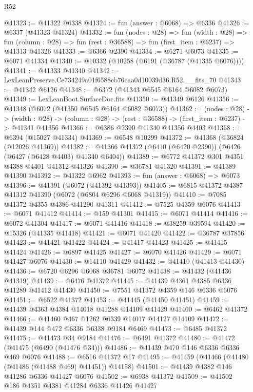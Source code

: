 \begin{lexlean}{R52}
\begin{coremodule}
@41323 := @41322 @6338
@41324 := fun (answer : @6068) => @6336
@41326 := @6337 (@41323 @41324)
@41332 := fun (nodes : @28) =>
  fun (width : @28) =>
  fun (column : @28) => fun (rest : @36588) => fun (first_item : @6237) => @41313 @41326
@41333 := @6366 @2390
@41334 := @6271 @6073
@41335 := @6071 @41334
@41340 := @10332 (@10258 (@6191 (@36787 (@41335 @6076))))
@41341 := @41333 @41340
@41342 := LexLeanPreserve.Ce734249a01f6588cb76caa0d10039d36.R52.__fits_70
@41343 := @41342 @6126
@41348 := @6372 (@41343 @6545 @6164 @6082 @6073)
@41349 := LexLeanBoot.SurfaceDoc.fits
@41350 := @41349 @6126
@41356 := @41348 (@6072 (@41350 @6545 @6164 @6082 @6073))
@41362 := (nodes : @28) ->
  (width : @28) -> (column : @28) -> (rest : @36588) -> (first_item : @6237) -> @41341 @41356
@41366 := @6386 @2390 @41340 @41356 @4403
@41368 := @6394 (@15027 @41334)
@41369 := @6548 @10299
@41372 := @41368 (@36824 (@12026 @41369))
@41382 := @41366 @41372 (@6410 (@6420 @2390)) (@6426 (@6427 (@6428 @4403) @41340 @6404))
@41389 := @6772 @41372 @301 @4351 @4388 @4401 @41312 @41326
@41390 := @36781 @41320
@41391 := @41389 @41390
@41392 := @41322 @6962
@41393 := fun (answer : @6068) => @6073
@41396 := @41391 (@6072 (@41392 @41393))
@41405 := @6815 @41372 @4387 @41312 @41390 (@6072 (@6804 @6296 @6068 @41319))
@41410 := @7085 @41372 @4355 @4386 @41290 @41311
@41412 := @7525 @4359 @6076
@41413 := @6071 @41412
@41414 := @159 @41301
@41415 := @6071 @41414
@41416 := @6072 @41304
@41417 := @6071 @41416
@41418 := @38259 @39594
@41420 := @15326 (@41335 @41418)
@41421 := @6071 @41420
@41422 := @36787 @37856
@41423 := @41421 @41422
@41424 := @41417 @41423
@41425 := @41415 @41424
@41426 := @6897 @41425
@41427 := @6070 @41426
@41429 := @6071 @41427 @6076
@41430 := @14110 @41429
@41432 := @41410 (@41413 @41430)
@41436 := @6720 @6296 @6068 @36781 @6072
@41438 := @41432 (@41436 @41319)
@41439 := @6476 @41372
@41445 := @41439 @4361 @4385 @6336 @41289 @41412 @41430
@41450 := @7551 @41372 @4359 @146 @6336 @6076
@41451 := @6522 @41372
@41453 := @41445 (@41450 @41451)
@41459 := @41439 @4363 @4384 @14018 @41288 @14109 @41429
@41460 := @6462 @41372
@41466 := @41460 @467 @1262 @6339 @14017 @14127 @14109
@41472 := @41439 @144 @472 @6336 @6338 @9184 @6469
@41473 := @6485 @41372
@41475 := @41473 @34 @9184
@41476 := @6491 @41372
@41480 := @41472 (@41475 (@6490 (@41476 @34)))
@41486 := @41439 @470 @146 @6336 @6336 @469 @6076
@41488 := @6516 @41372 @17
@41495 := @41459 (@41466 (@41480 (@41486 (@41488 @469) @41451)) @14158)
@41501 := @41439 @4382 @146 @41286 @6336 @41427 @6076
@41502 := @6938 @41372
@41509 := @41502 @186 @4351 @4381 @41284 @6336 @41426 @41427

\end{coremodule}
\end{lexlean}
